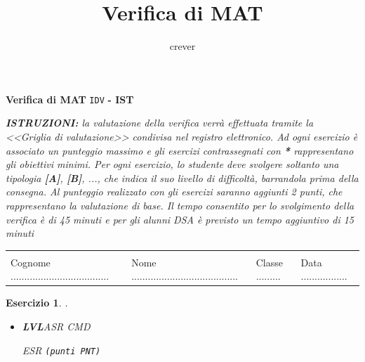 \documentclass[a4paper,12pt]{article}
\title{Verifica di {MAT} }
\author{crever}
\theoremstyle{plain}
\newtheorem{esercizio}{Esercizio}
\begin{document}

\begin{center}
	{\textbf{Verifica di {MAT}} \verb!IDV! \textbf{- {IST} }}
\end{center}

\small{\textit{\textbf{ISTRUZIONI:} la valutazione della verifica verrà effettuata tramite la <<Griglia di valutazione>> condivisa nel registro
elettronico. Ad ogni esercizio è associato un punteggio massimo e gli esercizi contrassegnati con \emph{\textbf{*}} rappresentano gli obiettivi minimi. Per ogni esercizio, lo studente deve svolgere soltanto una tipologia \emph{\textbf{[A]}}, \emph{\textbf{[B]}}, ..., che indica il suo livello di difficolt{\`a}, barrandola prima della consegna. Al punteggio realizzato con gli esercizi saranno aggiunti 2 punti, che rappresentano la valutazione di base. Il tempo consentito per lo svolgimento della verifica è di 45 minuti e per gli alunni DSA è previsto un tempo aggiuntivo di 15 minuti}}

\begin{center}
	\begin{tabular}{llll}
		\hline
		&  &  & \\
		Cognome .................................... & 
		Nome ....................................... &
		Classe ......... & 
		Data .................\\
		\hline
	\end{tabular}
\end{center}


\begin{esercizio}{.}
	\begin{itemize}
		\item \emph{\textbf{LVL}{ASR} {CMD}} 
			
		{ESR}
		\hspace*{\fill} {\verb!(punti PNT)!}
		\medskip
	\end{itemize}
\end{esercizio}	
\end{document}

